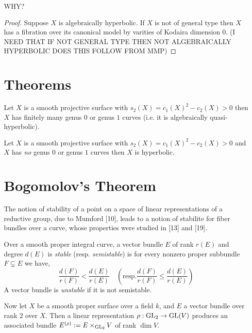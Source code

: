 \documentclass[12pt]{article}
\begin{document}
WHY?
\begin{proof}
Suppose $X$ is algebraically hyperbolic. If $X$ is not of general type then $X$ has a fibration over its canonical model by varities of Kodaira dimension $0$. (I NEED THAT IF NOT GENERAL TYPE THEN NOT ALGEBRAICALLY HYPERBOLIC DOES THIS FOLLOW FROM MMP)
\end{proof}

\section{Theorems}

\begin{theorem}[Bogomolov]
Let $X$ is a smooth projective surface with $s_2(X) = c_1(X)^2 - c_2(X) > 0$ then $X$ has finitely many genus $0$ or genus $1$ curves (i.e. it is algebraically quasi-hyperbolic).
\end{theorem}

\begin{theorem}[McQuillian]
Let $X$ is a smooth projective surface with $s_2(X) = c_1(X)^2 - c_2(X) > 0$ and $X$ has \textit{no} genus $0$ or genus $1$ curves then $X$ is hyperbolic.
\end{theorem}



\section{Bogomolov's Theorem}


The notion of stability of a point on a space of linear representations of a reductive group, due to Mumford [10], leads to a notion of stabilite for fiber bundles over a curve, whose properties were studied in [13] and [19].

\begin{defn}
Over a smooth proper integral curve, a vector bundle $E$ of rank $r(E)$ and degree $d(E)$ is \textit{stable} (resp. \textit{semistable}) is for every nonzero proper subbundle $F \subsetneq E$ we have,
\[ \frac{d(F)}{r(F)} < \frac{d(E)}{r(E)} \quad \left( \text{resp.} \frac{d(F)}{r(F)} \le \frac{d(E)}{r(E)} \right) \]
A vector bundle is \textit{unstable} if it is not semistable.
\end{defn}

Now let $X$ be a smooth proper surface over a field $k$, and $E$ a vector bundle over rank $2$ over $X$. Then a linear representation $\rho : \mathrm{GL}_2 \to \mathrm{GL}(V)$ produces an associated bundle $E^{(\rho)} := E \times_{\mathrm{GL}_2} V$ of rank $\dim{V}$. 
\end{document}
